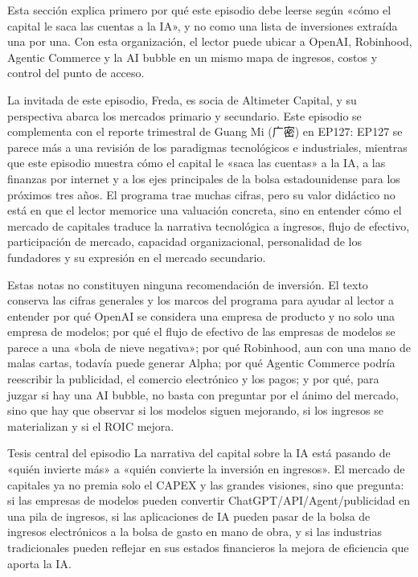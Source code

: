 \documentclass[a4paper]{article}
\begin{document}
Esta sección explica primero por qué este episodio debe leerse según «cómo el capital le saca las cuentas a la IA», y no como una lista de inversiones extraída una por una. Con esta organización, el lector puede ubicar a OpenAI, Robinhood, Agentic Commerce y la AI bubble en un mismo mapa de ingresos, costos y control del punto de acceso.

La invitada de este episodio, Freda, es socia de Altimeter Capital, y su perspectiva abarca los mercados primario y secundario. Este episodio se complementa con el reporte trimestral de Guang Mi (广密) en EP127: EP127 se parece más a una revisión de los paradigmas tecnológicos e industriales, mientras que este episodio muestra cómo el capital le «saca las cuentas» a la IA, a las finanzas por internet y a los ejes principales de la bolsa estadounidense para los próximos tres años. El programa trae muchas cifras, pero su valor didáctico no está en que el lector memorice una valuación concreta, sino en entender cómo el mercado de capitales traduce la narrativa tecnológica a ingresos, flujo de efectivo, participación de mercado, capacidad organizacional, personalidad de los fundadores y su expresión en el mercado secundario.

Estas notas no constituyen ninguna recomendación de inversión. El texto conserva las cifras generales y los marcos del programa para ayudar al lector a entender por qué OpenAI se considera una empresa de producto y no solo una empresa de modelos; por qué el flujo de efectivo de las empresas de modelos se parece a una «bola de nieve negativa»; por qué Robinhood, aun con una mano de malas cartas, todavía puede generar Alpha; por qué Agentic Commerce podría reescribir la publicidad, el comercio electrónico y los pagos; y por qué, para juzgar si hay una AI bubble, no basta con preguntar por el ánimo del mercado, sino que hay que observar si los modelos siguen mejorando, si los ingresos se materializan y si el ROIC mejora.

\begin{importantbox}{Tesis central del episodio}
La narrativa del capital sobre la IA está pasando de «quién invierte más» a «quién convierte la inversión en ingresos». El mercado de capitales ya no premia solo el CAPEX y las grandes visiones, sino que pregunta: si las empresas de modelos pueden convertir ChatGPT/API/Agent/publicidad en una pila de ingresos, si las aplicaciones de IA pueden pasar de la bolsa de ingresos electrónicos a la bolsa de gasto en mano de obra, y si las industrias tradicionales pueden reflejar en sus estados financieros la mejora de eficiencia que aporta la IA.
\end{importantbox}
\end{document}
